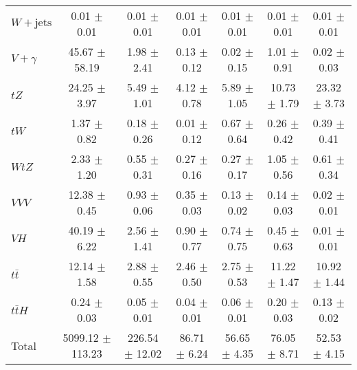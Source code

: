 \begin{tabular}{|l|c|c|c|c|c|c|}
  $W+\text{jets}$   & 0.01 $\pm$ 0.01 & 0.01 $\pm$ 0.01 & 0.01 $\pm$ 0.01 & 0.01 $\pm$ 0.01 & 0.01 $\pm$ 0.01 & 0.01 $\pm$ 0.01 \\ 
  $V+\gamma$   & 45.67 $\pm$ 58.19 & 1.98 $\pm$ 2.41 & 0.13 $\pm$ 0.12 & 0.02 $\pm$ 0.15 & 1.01 $\pm$ 0.91 & 0.02 $\pm$ 0.03 \\ 
  $tZ$   & 24.25 $\pm$ 3.97 & 5.49 $\pm$ 1.01 & 4.12 $\pm$ 0.78 & 5.89 $\pm$ 1.05 & 10.73 $\pm$ 1.79 & 23.32 $\pm$ 3.73 \\ 
  $tW$   & 1.37 $\pm$ 0.82 & 0.18 $\pm$ 0.26 & 0.01 $\pm$ 0.12 & 0.67 $\pm$ 0.64 & 0.26 $\pm$ 0.42 & 0.39 $\pm$ 0.41 \\ 
  $WtZ$   & 2.33 $\pm$ 1.20 & 0.55 $\pm$ 0.31 & 0.27 $\pm$ 0.16 & 0.27 $\pm$ 0.17 & 1.05 $\pm$ 0.56 & 0.61 $\pm$ 0.34 \\ 
  $VVV$   & 12.38 $\pm$ 0.45 & 0.93 $\pm$ 0.06 & 0.35 $\pm$ 0.03 & 0.13 $\pm$ 0.02 & 0.14 $\pm$ 0.03 & 0.02 $\pm$ 0.01 \\ 
  $VH$   & 40.19 $\pm$ 6.22 & 2.56 $\pm$ 1.41 & 0.90 $\pm$ 0.77 & 0.74 $\pm$ 0.75 & 0.45 $\pm$ 0.63 & 0.01 $\pm$ 0.01 \\ 
  $t\bar{t}$   & 12.14 $\pm$ 1.58 & 2.88 $\pm$ 0.55 & 2.46 $\pm$ 0.50 & 2.75 $\pm$ 0.53 & 11.22 $\pm$ 1.47 & 10.92 $\pm$ 1.44 \\ 
  $t\bar{t}H$   & 0.24 $\pm$ 0.03 & 0.05 $\pm$ 0.01 & 0.04 $\pm$ 0.01 & 0.06 $\pm$ 0.01 & 0.20 $\pm$ 0.03 & 0.13 $\pm$ 0.02 \\ 
\hline 
  Total  & 5099.12 $\pm$ 113.23 & 226.54 $\pm$ 12.02 & 86.71 $\pm$ 6.24 & 56.65 $\pm$ 4.35 & 76.05 $\pm$ 8.71 & 52.53 $\pm$ 4.15 \\ 
\hline 
\end{tabular} 
